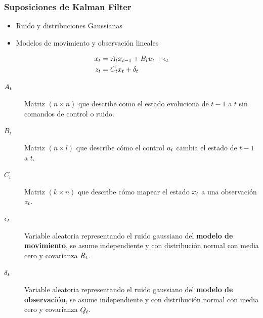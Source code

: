 \begin{frame}
    \frametitle{Suposiciones de Kalman Filter}
    \small
    \begin{itemize}
        \item Ruido y distribuciones Gaussianas
        \item Modelos de movimiento y observación lineales
    \end{itemize}
    
    \begin{align*}
        x_{t} &= A_{t} x_{t-1} + B_{t}u_{t} + \epsilon_{t}\\
        z_{t} &= C_{t} x_{t} + \delta_{t}
    \end{align*}
    
       \begin{description}
        \item[$A_{t}$] Matriz $(n \times n)$ que describe como el estado evoluciona de $t-1$ a $t$ sin comandos de control o ruido.
        
        \item[$B_{t}$] Matriz $(n \times l)$ que describe cómo el control $u_{t}$ cambia el estado de $t-1$ a $t$.
        
        \item[$C_{t}$] Matriz $(k \times n)$ que describe cómo mapear el estado $x_{t}$ a una observación $z_{t}$.
        
        \item[$\epsilon_{t}$] Variable aleatoria representando el ruido gaussiano del {\bf modelo de movimiento}, se asume independiente y con distribución normal con media cero y covarianza $R_{t}$.
        
        \item[$\delta_{t}$] Variable aleatoria representando el ruido gaussiano del {\bf modelo de observación}, se asume independiente y con distribución normal con media cero y covarianza $Q_{t}$.
        
    \end{description}
    

\end{frame}

